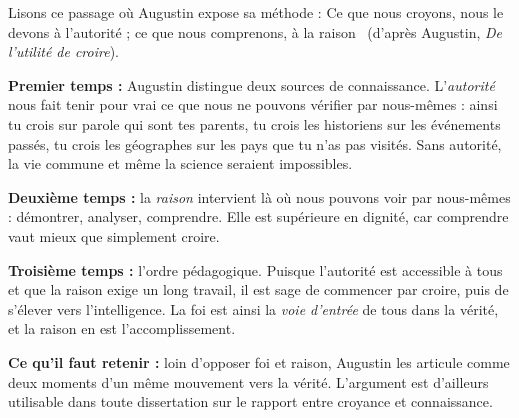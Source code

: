 \documentclass[11pt]{article}
\begin{document}
\begin{experience}
Lisons ce passage où Augustin expose sa méthode : \guillemotleft Ce que nous croyons, nous le devons à l'autorité ; ce que nous comprenons, à la raison \guillemotright\ (d'après Augustin, \emph{De l'utilité de croire}).

\textbf{Premier temps :} Augustin distingue deux sources de connaissance. L'\emph{autorité} nous fait tenir pour vrai ce que nous ne pouvons vérifier par nous-mêmes : ainsi tu crois sur parole qui sont tes parents, tu crois les historiens sur les événements passés, tu crois les géographes sur les pays que tu n'as pas visités. Sans autorité, la vie commune et même la science seraient impossibles.

\textbf{Deuxième temps :} la \emph{raison} intervient là où nous pouvons voir par nous-mêmes : démontrer, analyser, comprendre. Elle est supérieure en dignité, car comprendre vaut mieux que simplement croire.

\textbf{Troisième temps :} l'ordre pédagogique. Puisque l'autorité est accessible à tous et que la raison exige un long travail, il est sage de commencer par croire, puis de s'élever vers l'intelligence. La foi est ainsi la \emph{voie d'entrée} de tous dans la vérité, et la raison en est l'accomplissement.

\textbf{Ce qu'il faut retenir :} loin d'opposer foi et raison, Augustin les articule comme deux moments d'un même mouvement vers la vérité. L'argument est d'ailleurs utilisable dans toute dissertation sur le rapport entre croyance et connaissance.
\end{experience}
\end{document}

